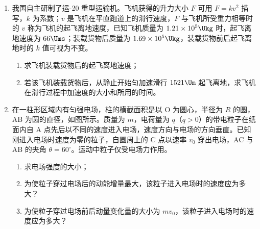 \documentclass[\gkver]{gaokaozhenti}
\begin{document}
\begin{enumerate}
\item
我国自主研制了运-20 重型运输机。飞机获得的升力大小 $F$ 可用 $F=kv^{2}$ 描写，$k$ 为系数；$v$ 是飞机在平直跑道上的滑行速度，$F$ 与飞机所受重力相等时的 $v$ 称为飞机的起飞离地速度，已知飞机质量为 $1.21\times10^{5}\Ukg$ 时，起飞离地速度为 $66\Ums$；装载货物后质量为 $1.69\times10^{5}\Ukg$，装载货物前后起飞离地时的 $k$ 值可视为不变。
\begin{enumerate}
	\item
	求飞机装载货物后的起飞离地速度；
	\item
	若该飞机装载货物后，从静止开始匀加速滑行 $1521\Um$ 起飞离地，求飞机在滑行过程中加速度的大小和所用的时间。
\end{enumerate}

\item
在一柱形区域内有匀强电场，柱的横截面积是以 O 为圆心，半径为 $R$ 的圆，AB 为圆的直径，如图所示。质量为 $m$，电荷量为 $q$（$q>0$）的带电粒子在纸面内自 A 点先后以不同的速度进入电场，速度方向与电场的方向垂直。已知刚进入电场时速度为零的粒子，自圆周上的 C 点以速率 $v_{0}$ 穿出电场，AC 与 AB 的夹角 $\theta=60^\circ$。运动中粒子仅受电场力作用。
\begin{enumerate}
	\item
	求电场强度的大小；
	\item
	为使粒子穿过电场后的动能增量最大，该粒子进入电场时的速度应为多大？
	\item
	为使粒子穿过电场前后动量变化量的大小为 $mv_{0}$，该粒子进入电场时的速度应为多大？
\end{enumerate}
\onepicture[align=right, w=3.82cm]{}
\end{enumerate}
\end{document}
